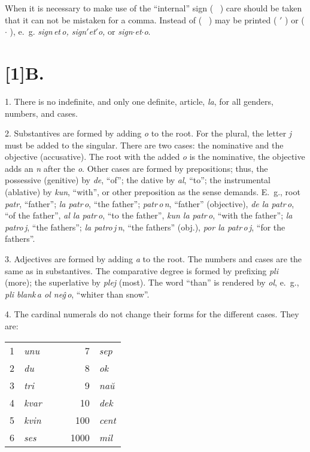\documentclass[12pt,twoside]{book}
\begin{document}
When it is necessary to make use of the ``internal'' sign ( \, ) care should be taken that it can not be mistaken for a comma.  Instead of ( \, ) may be printed ( {$'$} ) or ( $\cdot$ ), e.~g. \emph{sign\,et\,o, sign{$'$}et{$'$}o,} or \emph{sign$\cdot$et$\cdot$o}.

\section*{\scalebox{0.8}[1]B. \hspace{.2em} }

1. There is no indefinite, and only one definite, article, \emph{la}, for all genders, numbers, and cases.

2. Substantives are formed by adding \emph{o} to the root. For the plural, the letter \emph{j} must be added to the singular. There are two cases: the nominative and the objective (accusative). The root with the added \emph{o} is the nominative, the objective adds an \emph{n} after the \emph{o}. Other cases are formed by prepositions; thus, the possessive (genitive) by \emph{de}, “of”; the dative by \emph{al}, “to”; the instrumental (ablative) by \emph{kun}, “with”, or other preposition as the sense demands. E.~g., root \emph{patr}, “father”; \emph{la patr\,o}, “the father”; \emph{patr\,o\,n}, “father” (objective), \emph{de la patr\,o}, “of the father”, \emph{al la patr\,o}, “to the father”, \emph{kun la patr\,o}, “with the father”; \emph{la patro\,j}, “the fathers”; \emph{la patro\,j\,n}, “the fathers” (obj.), \emph{por la patr\,o\,j}, “for the fathers”.

3. Adjectives are formed by adding \emph{a} to the root. The numbers and cases are the same as in substantives. The comparative degree is formed by prefixing \emph{pli} (more); the superlative by \emph{plej} (most). The word “than” is rendered by \emph{ol}, e.~g., \emph{pli blank\,a ol neĝ\,o}, “whiter than snow”.

4. The cardinal numerals do not change their forms for the different cases. They are:

\begin{center}
\begin{tabular}{rlccrl}
1 & \emph{unu} & \hspace{2em} & \hspace{2em} & 7 & \emph{sep} \\
2 & \emph{du} & & & 8 & \emph{ok} \\
3 & \emph{tri} & & & 9 & \emph{naŭ} \\
4 & \emph{kvar} & & & 10 & \emph{dek} \\
5 & \emph{kvin} & & & 100 & \emph{cent} \\
6 & \emph{ses} & & & 1000 & \emph{mil} 
\end{tabular}
\end{center}
\end{document}
